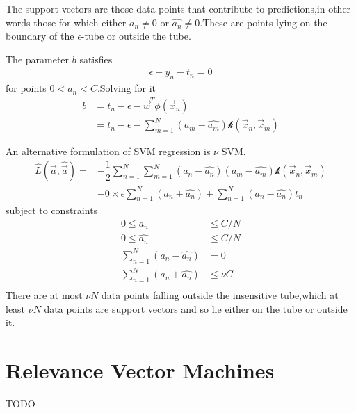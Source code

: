 The support vectors are those data points that contribute to predictions,in other words those for which either $a_n \neq 0$ or $\hat{a_n} \neq 0$.These are points lying on the boundary of the $\epsilon$-tube or outside the tube.

The parameter $b$ satisfies 
\begin{align}
\epsilon+y_n-t_n= 0
\end{align}
for points $0<a_n<C$.Solving for it
\begin{align}
b &= t_n-\epsilon-\vec{w}^T\phi(\vec{x}_n) \\
  &= t_n-\epsilon-\sum_{m=1}^{N}(a_m-\hat{a_m})\mathcal{k}(\vec{x}_n,\vec{x}_m)
\end{align}

An alternative formulation of SVM regression is $\nu$ SVM.
\begin{align}
\hat{L}(\vec{a},\hat{\vec{a}}) =&-\dfrac{1}{2}\sum_{n=1}^{N}\sum_{m=1}^{N}(a_n-\hat{a_n})(a_m-\hat{a_m})\mathcal{k}(\vec{x}_n,\vec{x}_m) \\
&-0\times\epsilon\sum_{n=1}^{N}(a_n+\hat{a_n})+\sum_{n=1}^{N}(a_n-\hat{a_n})t_n
\end{align}
subject to constraints
\begin{align}
0\leq a_n &\leq C/N\\
0\leq \hat{a_n} &\leq C/N \\
\sum_{n=1}^{N}(a_n-\hat{a_n}) &=0 \\
\sum_{n=1}^{N}(a_n+\hat{a_n}) &\leq \nu C \\
\end{align}
There are at most $\nu N$ data points falling outside the insensitive tube,which at least $\nu N$ data points are support vectors and so lie either on the tube or outside it.

\section{Relevance Vector Machines}
TODO










